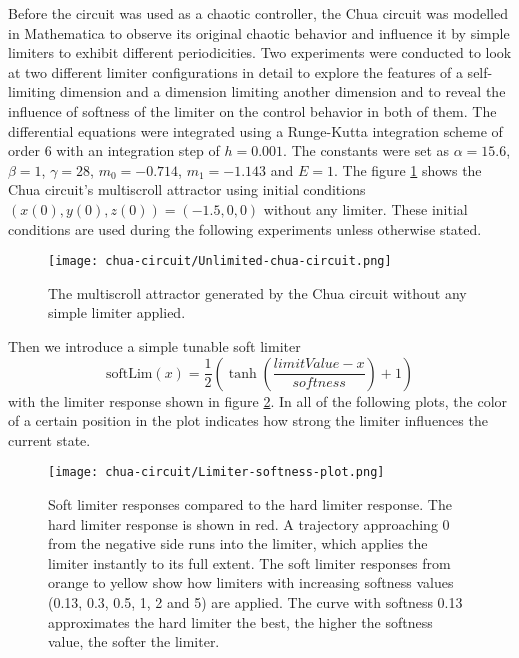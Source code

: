\documentclass[main]{subfiles}
\begin{document}
Before the circuit was used as a chaotic controller, the Chua circuit was modelled in Mathematica to observe its original chaotic behavior and influence it by simple limiters to exhibit different periodicities. %
%
Two experiments were conducted to look at two different limiter configurations in detail to explore the features of a self-limiting dimension and a dimension limiting another dimension and to reveal the influence of softness of the limiter on the control behavior in both of them. %
%
The differential equations were integrated using a Runge-Kutta integration scheme of order 6 with an integration step of \(h=0.001\). %
%
The constants were set as \(\alpha = 15.6\), \(\beta = 1\), \(\gamma = 28\), \(m_0 = -0.714\), \(m_1 = -1.143\) and \(E = 1\). %
%
The figure \ref{figure:chaoticchuacircuit} shows the Chua circuit's multiscroll attractor using initial conditions \((x(0),y(0),z(0)) = (-1.5,0,0)\) without any limiter. %
%
These initial conditions are used during the following experiments unless otherwise stated.

\begin{figure}[H]
\centering
\texttt{[image: chua-circuit/Unlimited-chua-circuit.png]}
\caption[The multiscroll attractor in the Chua circuit]{The multiscroll attractor generated by the Chua circuit without any simple limiter applied.}
\label{figure:chaoticchuacircuit}
\end{figure}

Then we introduce a simple tunable soft limiter \[\text{softLim}(x) = \frac{1}{2} \left(\tanh\left(\frac{limitValue - x}{softness}\right) + 1\right)\] with the limiter response shown in figure \ref{figure:softlimiterresponse}. In all of the following plots, the color of a certain position in the plot indicates how strong the limiter influences the current state.

\begin{figure}[H]
\centering
\texttt{[image: chua-circuit/Limiter-softness-plot.png]}
\caption[Soft limiter responses]{Soft limiter responses compared to the hard limiter response. The hard limiter response is shown in red. A trajectory approaching 0 from the negative side runs into the limiter, which applies the limiter instantly to its full extent. The soft limiter responses from orange to yellow show how limiters with increasing softness values (0.13, 0.3, 0.5, 1, 2 and 5) are applied. The curve with softness 0.13 approximates the hard limiter the best, the higher the softness value, the softer the limiter.}
\label{figure:softlimiterresponse}
\end{figure}
\end{document}
